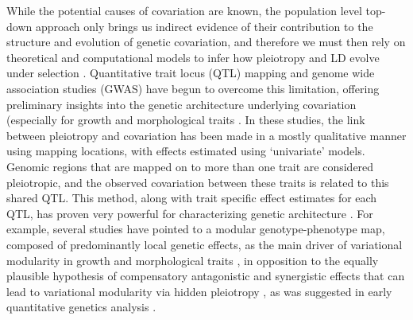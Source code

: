 \begin{refsection}
While the potential causes of covariation are known, the population
level top-down approach only brings us indirect evidence of their
contribution to the structure and evolution of genetic covariation, and
therefore we must then rely on theoretical and computational models to
infer how pleiotropy and LD evolve under selection \parencite{Barton1990-uu,Hansen2006-yc,Pavlicev2011-wz,Melo2015-bk}.
Quantitative trait locus (QTL) mapping and genome wide association
studies (GWAS) have begun to overcome this limitation, offering
preliminary insights into the genetic architecture underlying
covariation (especially for growth and morphological traits \parencite{Leamy2002-nh,Wolf2005-nr,Kenney-Hunt2008-bd,Porto2016-qc}.
In these studies, the link between pleiotropy and covariation has been
made in a mostly qualitative manner using mapping locations, with
effects estimated using `univariate' models. Genomic regions that are
mapped on to more than one trait are considered pleiotropic, and the
observed covariation between these traits is related to this shared QTL.
This method, along with trait specific effect estimates for each QTL,
has proven very powerful for characterizing genetic architecture \parencite{Wang2010-da,Wagner2011-kp}.
For example, several studies have pointed to a
modular genotype-phenotype map, composed of predominantly local genetic
effects, as the main driver of variational modularity in growth and
morphological traits \parencite{Leamy2002-nh,Cheverud1996-fm,Mezey2000-rs},
in opposition to the equally
plausible hypothesis of compensatory antagonistic and synergistic effects
 that can lead to variational modularity via hidden pleiotropy \parencite{Pavlicev2011-xm},
as was suggested in early quantitative genetics analysis \parencite{Cheverud1983-fq}.


\end{refsection}
